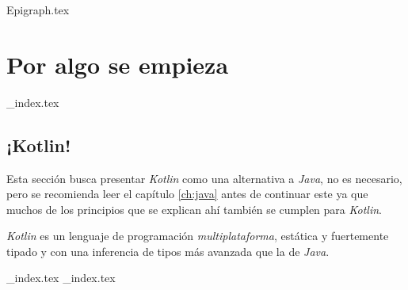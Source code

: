 {Epigraph.tex}
\part{Por algo se empieza}
  {_index.tex}
  
  \chapter{¡Kotlin!}
    Esta sección busca presentar \textit{Kotlin} como una alternativa a \textit{Java}, no es 
    necesario, pero se recomienda leer el capítulo \ref{ch:java} antes de continuar este ya que 
    muchos de los principios que se explican ahí también se cumplen para \textit{Kotlin}.
    
    \textit{Kotlin} es un lenguaje de programación \textit{multiplataforma}, estática y fuertemente 
    tipado y con una inferencia de tipos más avanzada que la de \textit{Java}.
  
  {_index.tex}
  {_index.tex}

